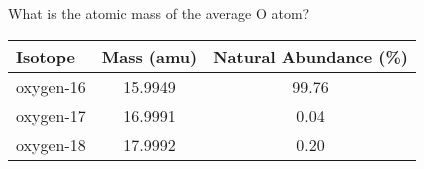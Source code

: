 \documentclass[notes=show]{beamer}
\begin{document}

\begin{onyourown}%
	What is the atomic mass of the average O atom?

	\begin{center}
		\begin{tabular} {l S[table-format=2.4] S[table-format=2.2]}
			\toprule
			\bfseries Isotope & {\bfseries Mass (amu)} & {\bfseries Natural Abundance (\%)} \\
			\midrule
			oxygen-16 & 15.9949 & 99.76 \\
			oxygen-17 & 16.9991 & 0.04 \\
			oxygen-18 & 17.9992 & 0.20 \\
			\bottomrule
		\end{tabular}
	\end{center}
\end{onyourown}
\end{document}
